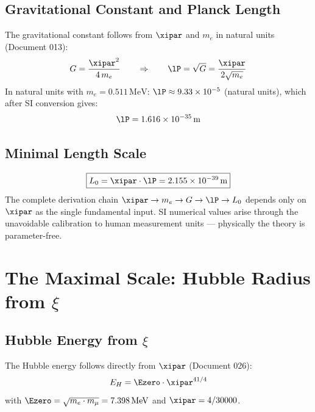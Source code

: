 \subsection{Gravitational Constant and Planck Length}

The gravitational constant follows from $\xipar$ and $m_e$ in natural units (Document 013):
\begin{equation}
	G = \frac{\xipar^2}{4\,m_e} \qquad\Rightarrow\qquad \lP = \sqrt{G} = \frac{\xipar}{2\sqrt{m_e}}
\end{equation}
In natural units with $m_e = 0{.}511\,\text{MeV}$: $\lP \approx 9{.}33 \times 10^{-5}$ (natural units), which after SI conversion gives:
\begin{equation}
	\lP = 1{.}616 \times 10^{-35}\,\text{m}
\end{equation}

\subsection{Minimal Length Scale}

\begin{keyresult}
\begin{equation}
	\boxed{L_0 = \xipar \cdot \lP = 2{.}155 \times 10^{-39}\,\text{m}}
\end{equation}
The complete derivation chain $\xipar \to m_e \to G \to \lP \to L_0$ depends only on $\xipar$ as the single fundamental input. SI numerical values arise through the unavoidable calibration to human measurement units — physically the theory is parameter-free.
\end{keyresult}

\section{The Maximal Scale: Hubble Radius from \texorpdfstring{$\xi$}{xi}}

\subsection{Hubble Energy from \texorpdfstring{$\xi$}{xi}}

The Hubble energy follows directly from $\xipar$ (Document 026):
\begin{equation}
	E_H = \Ezero \cdot \xipar^{41/4}
\end{equation}
with $\Ezero = \sqrt{m_e \cdot m_\mu} = 7{.}398\,\text{MeV}$ and $\xipar = 4/30000$.

